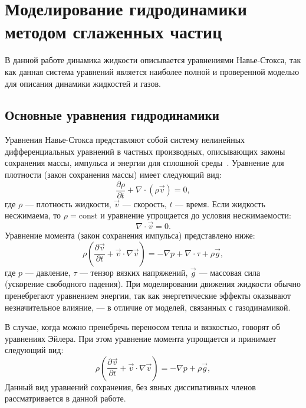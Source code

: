 \chapter{Моделирование гидродинамики методом сглаженных частиц}

В данной работе динамика жидкости описывается уравнениями Навье-Стокса, 
так как данная система уравнений является наиболее полной и проверенной моделью для описания динамики жидкостей и газов.

\section{Основные уравнения гидродинамики}\label{sec:ns_eq}
Уравнения Навье-Стокса представляют собой систему нелинейных дифференциальных уравнений в частных производных, 
описывающих законы сохранения массы, импульса и энергии для сплошной среды~\cite{Lomax2001}.
%
Уравнение для плотности (закон сохранения массы) имеет следующий вид:
%
\begin{equation}
    \frac{\partial \rho}{\partial t} + \nabla \cdot (\rho \vec{v}) = 0,
\end{equation}
%
где $\rho$ --- плотность жидкости,
$\vec{v}$ --- скорость,
$t$ --- время. 
%
Если жидкость несжимаема, то $\rho = \text{const}$ и уравнение упрощается до условия несжимаемости:
%
\begin{equation}
    \nabla \cdot \vec{v} = 0.
\end{equation}
%
Уравнение момента (закон сохранения импульса) представлено ниже:
%
\begin{equation}
    \rho \left( \frac{\partial \vec{v}}{\partial t} + \vec{v} \cdot \nabla \vec{v} \right)
        = -\nabla p + \nabla \cdot \tau + \rho \vec{g},
\end{equation}
%
где $p$ --- давление,
$\tau$ --- тензор вязких напряжений,
$\vec{g}$ --- массовая сила (ускорение свободного падения). 
%
При моделировании движения жидкости обычно пренебрегают уравнением энергии, 
так как энергетические эффекты оказывают незначительное влияние, --- в отличие от моделей, связанных с газодинамикой.

В случае, когда можно пренебречь переносом тепла и вязкостью, говорят об уравнениях Эйлера.
При этом уравнение момента упрощается и принимает следующий вид:
%
\begin{equation}\label{eq:vel}
    \rho \left( \frac{\partial \vec{v}}{\partial t} + \vec{v}\cdot\nabla\vec{v} \right) = -\nabla p + \rho\vec{g},
\end{equation}
%
Данный вид уравнений сохранения, 
без явных диссипативных членов рассматривается в данной работе.

